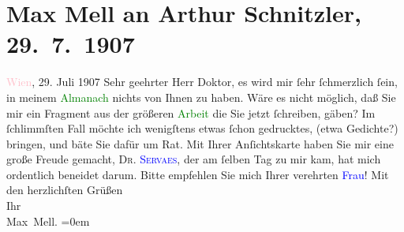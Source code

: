

               \section[Max Mell an Arthur Schnitzler, 29. 7. 1907]{ Max Mell an Arthur Schnitzler, 29. 7. 1907}\nopagebreak{}\rehead{ }\normalsize\beginnumbering{} \toendnotes[C]{\smallbreak\pagebreak[2]} 
\toendnotes[C]{\smallbreak}\pstart
           \raggedleft{}{\pb}\textcolor{pink}{Wien}{}\ledrightnote{\textcolor{pink}{Wien}}, 29. Juli 1907\pend
           \pstart{}Sehr geehrter Herr Doktor,\pend\pstart
           es wird mir ſehr ſchmerzlich ſein, in meinem \textcolor{green}{Almanach}{} nichts von Ihnen zu haben. Wäre es nicht
                    möglich, daß Sie mir ein Fragment aus der größeren \textcolor{green}{Arbeit}{} die Sie jetzt ſchreiben, gäben? Im ſchlimmſten
                    Fall möchte ich wenigſtens etwas ſchon gedrucktes, (etwa Gedichte?) bringen, und
                    bäte Sie dafür um Rat.\pend
           \pstart
           Mit Ihrer Anſichtskarte haben Sie mir eine große Freude gemacht, \textsc{Dr. \textcolor{blue}{Servaes}{}\ledrightnote{\textcolor{blue}{Franz Servaes}}}, der am ſelben Tag zu mir kam, hat mich ordentlich {\pb}beneidet darum. Bitte empfehlen Sie
                    mich Ihrer verehrten \textcolor{blue}{Frau}{}!\pend
           \pstart
           Mit den herzlichſten Grüßen{\\[\baselineskip]}Ihr{\\[\baselineskip]}\spacefill\mbox{Max Mell.}\pend
           \leftskip=0em{}\endnumbering{}  
      